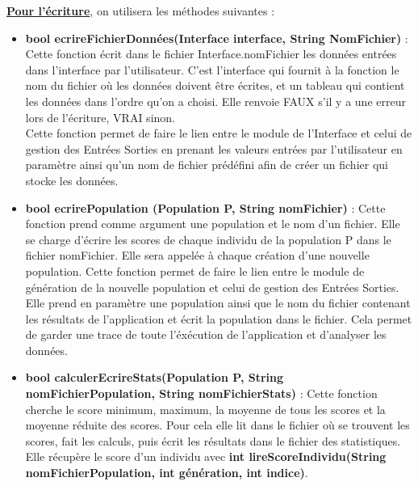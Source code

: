 \documentclass[a4paper,11pt]{article}
\begin{document}
			\underline{\bf Pour l'écriture}, on utilisera les méthodes suivantes :\\
			\begin{itemize}
				\item \textbf{bool ecrireFichierDonnées(Interface interface, String NomFichier)} : Cette fonction écrit dans le fichier Interface.nomFichier les données entrées dans l’interface par l’utilisateur. 
					C’est l’interface qui fournit à la fonction le nom du fichier où les données doivent être écrites, et un tableau qui contient les données dans l’ordre qu’on a choisi. 
					Elle renvoie FAUX s’il y a une erreur lors de l’écriture, VRAI sinon.\\
					Cette fonction permet de faire le lien entre le module de l’Interface et celui de gestion des Entrées Sorties en prenant les valeurs entrées par l’utilisateur en paramètre ainsi qu’un nom de fichier prédéfini afin de créer un fichier qui stocke les données.\vspace{0.2cm}
				\item \textbf{bool ecrirePopulation (Population P, String nomFichier)} : Cette fonction prend comme argument une population et le nom d’un fichier. 
					Elle se charge d’écrire les scores de chaque individu de la population P dans le fichier nomFichier. 
					Elle sera appelée à chaque création d’une nouvelle population. %
					Cette fonction permet de faire le lien entre le module de génération de la nouvelle population et celui de gestion des Entrées Sorties. 
					Elle prend en paramètre une population ainsi que le nom du fichier contenant les résultats de l’application et écrit la population dans le fichier. 
					Cela permet de garder une trace de toute l’éxécution de l’application et d’analyser les données.\vspace{0.2cm}
				\item \textbf{bool calculerEcrireStats(Population P, String nomFichierPopulation, String nomFichierStats)} : Cette fonction cherche le score minimum, maximum, la moyenne de tous les scores et la moyenne réduite des scores. 
					Pour cela elle lit dans le fichier où se trouvent les scores, fait les calculs, puis écrit les résultats dans le fichier des statistiques. 
					Elle récupère le score d’un individu avec \textbf{int lireScoreIndividu(String nomFichierPopulation, int génération, int indice)}. %

\end{itemize}
\end{document}
